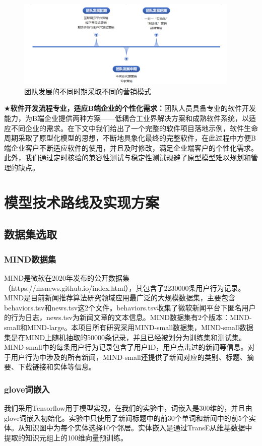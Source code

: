 \documentclass[withoutpreface,bwprint]{cumcmthesis} %
\begin{document}
	\begin{figure}[H]
		\includegraphics[width=0.95\textwidth]{营销发展}
		\caption{团队发展的不同时期采取不同的营销模式}
		\label{fig:circuit-diagcam}
	\end{figure}
	$\bigstar$\textbf{软件开发流程专业，适应B端企业的个性化需求：}团队人员具备专业的软件开发能力，为B端企业提供两种方案——低耦合工业界解决方案和成熟软件系统，以适应不同企业的需求。在下文中我们给出了一个完整的软件项目落地示例，软件生命周期采取了原型化模型的思想，不断地具象化最终的完整软件，在此过程中方便B端企业客户不断适应软件的使用，并且及时修改，满足企业端客户的个性化需求。此外，我们通过定时核验的兼容性测试与稳定性测试规避了原型模型难以规划和管理的缺点。\par
	\newpage
	\section{模型技术路线及实现方案}
	\subsection{数据集选取}
	\subsubsection{ MIND数据集}
	MIND是微软在2020年发布的公开数据集（https://msnews.github.io/index.html），其包含了2230000条用户行为记录。MIND是目前新闻推荐算法研究领域应用最广泛的大规模数据集，主要包含behaviors.tsv和news.tsv这2个文件。behaviors.tsv收集了微软新闻平台下匿名用户的行为日志，news.tsv为新闻文章的文本信息。MIND数据集有2个版本：MIND-small和MIND-large。本项目所有研究采用MIND-small数据集，MIND-small数据集是在MIND上随机抽取的50000条记录，并且已经被划分为训练集和测试集。MIND-small中的每条用户行为记录包含了用户ID，用户点击过的新闻等信息。对于用户行为中涉及的所有新闻，MIND-small还提供了新闻对应的类别、标题、摘要、下载链接和实体等信息。
	\subsubsection{ glove词嵌入}
	我们采用Tensorflow用于模型实现，在我们的实验中，词嵌入是300维的，并且由glove词嵌入初始化。实验中只使用了新闻标题中的前30个单词和新闻中的前5个实体。从知识图中为每个实体选择10个邻居。实体嵌入是通过TransE从维基数据中提取的知识元组上的100维向量预训练。
\end{document}
